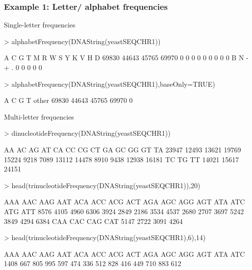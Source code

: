 \documentclass{beamer}
\begin{document}
\begin{frame}[fragile]
\frametitle{Example 1: Letter/ alphabet frequencies}
  \bit
      \item \small{Single-letter frequencies}
        \begin{uncoverenv}
\begin{Schunk}
\begin{Sinput}
> alphabetFrequency(DNAString(yeastSEQCHR1))
\end{Sinput}
\begin{Soutput}
    A     C     G     T     M     R     W     S     Y     K     V     H     D 
69830 44643 45765 69970     0     0     0     0     0     0     0     0     0 
    B     N     -     +     . 
    0     0     0     0     0 
\end{Soutput}
\begin{Sinput}
> alphabetFrequency(DNAString(yeastSEQCHR1),baseOnly=TRUE)
\end{Sinput}
\begin{Soutput}
    A     C     G     T other 
69830 44643 45765 69970     0 
\end{Soutput}
\end{Schunk}
        \end{uncoverenv}  
      \item \small{Multi-letter frequencies}
       \begin{uncoverenv}
\begin{Schunk}
\begin{Sinput}
> dinucleotideFrequency(DNAString(yeastSEQCHR1))
\end{Sinput}
\begin{Soutput}
   AA    AC    AG    AT    CA    CC    CG    CT    GA    GC    GG    GT    TA 
23947 12493 13621 19769 15224  9218  7089 13112 14478  8910  9438 12938 16181 
   TC    TG    TT 
14021 15617 24151 
\end{Soutput}
\begin{Sinput}
> head(trinucleotideFrequency(DNAString(yeastSEQCHR1)),20)
\end{Sinput}
\begin{Soutput}
 AAA  AAC  AAG  AAT  ACA  ACC  ACG  ACT  AGA  AGC  AGG  AGT  ATA  ATC  ATG  ATT 
8576 4105 4960 6306 3924 2849 2186 3534 4537 2680 2707 3697 5242 3849 4294 6384 
 CAA  CAC  CAG  CAT 
5147 2722 3091 4264 
\end{Soutput}
\begin{Sinput}
> head(trinucleotideFrequency(DNAString(yeastSEQCHR1),6),14)
\end{Sinput}
\begin{Soutput}
 AAA  AAC  AAG  AAT  ACA  ACC  ACG  ACT  AGA  AGC  AGG  AGT  ATA  ATC 
1408  667  805  995  597  474  336  512  828  416  449  710  883  612 
\end{Soutput}
\end{Schunk}
        \end{uncoverenv} 
  \eit
\end{frame}
\end{document}
